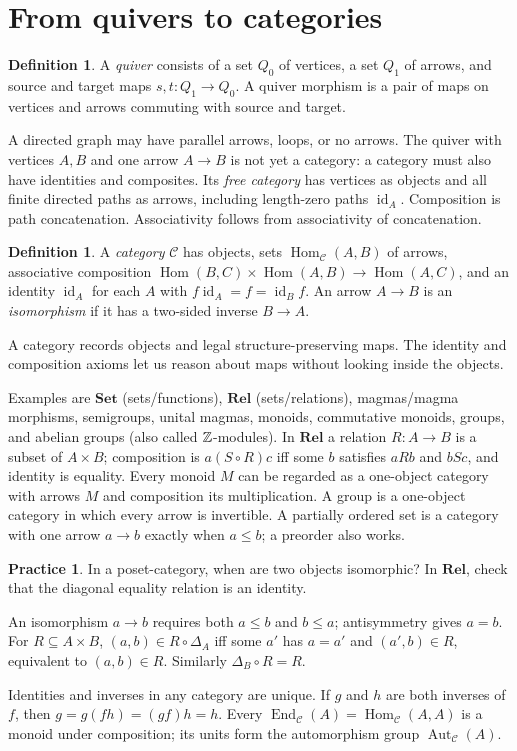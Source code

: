 \documentclass[11pt,openany]{book}
\newcommand{\id}{\operatorname{id}}\newcommand{\Sym}{\operatorname{Sym}}
\newcommand{\Hom}{\operatorname{Hom}}\newcommand{\Aut}{\operatorname{Aut}}
\newcommand{\End}{\operatorname{End}}\newcommand{\im}{\operatorname{im}}
\theoremstyle{definition}
\newtheorem{definition}[theorem]{Definition}
\newtheorem{exercise}[theorem]{Practice}
\begin{document}
\section{From quivers to categories}
\begin{definition}A \emph{quiver} consists of a set $Q_0$ of vertices, a set $Q_1$ of arrows, and source and target maps $s,t:Q_1\to Q_0$. A quiver morphism is a pair of maps on vertices and arrows commuting with source and target.\end{definition}
A directed graph may have parallel arrows, loops, or no arrows. The quiver with vertices $A,B$ and one arrow $A\to B$ is not yet a category: a category must also have identities and composites. Its \emph{free category} has vertices as objects and all finite directed paths as arrows, including length-zero paths $\id_A$. Composition is path concatenation. Associativity follows from associativity of concatenation.
\begin{definition}A \emph{category} $\mathcal C$ has objects, sets $\Hom_{\mathcal C}(A,B)$ of arrows, associative composition $\Hom(B,C)\times\Hom(A,B)\to\Hom(A,C)$, and an identity $\id_A$ for each $A$ with $f\id_A=f=\id_Bf$. An arrow $A\to B$ is an \emph{isomorphism} if it has a two-sided inverse $B\to A$.\end{definition}
\begin{intuition}A category records objects and legal structure-preserving maps. The identity and composition axioms let us reason about maps without looking inside the objects.\end{intuition}
Examples are $\mathbf{Set}$ (sets/functions), $\mathbf{Rel}$ (sets/relations), magmas/magma morphisms, semigroups, unital magmas, monoids, commutative monoids, groups, and abelian groups (also called $\mathbb Z$-modules). In $\mathbf{Rel}$ a relation $R:A\to B$ is a subset of $A\times B$; composition is $a(S\circ R)c$ iff some $b$ satisfies $aRb$ and $bSc$, and identity is equality. Every monoid $M$ can be regarded as a one-object category with arrows $M$ and composition its multiplication. A group is a one-object category in which every arrow is invertible. A partially ordered set is a category with one arrow $a\to b$ exactly when $a\le b$; a preorder also works.
\begin{exercise}In a poset-category, when are two objects isomorphic? In $\mathbf{Rel}$, check that the diagonal equality relation is an identity.\end{exercise}
\begin{solution}An isomorphism $a\to b$ requires both $a\le b$ and $b\le a$; antisymmetry gives $a=b$. For $R\subseteq A\times B$, $(a,b)\in R\circ\Delta_A$ iff some $a'$ has $a=a'$ and $(a',b)\in R$, equivalent to $(a,b)\in R$. Similarly $\Delta_B\circ R=R$.\end{solution}
Identities and inverses in any category are unique. If $g$ and $h$ are both inverses of $f$, then $g=g(fh)=(gf)h=h$. Every $\End_{\mathcal C}(A)=\Hom_{\mathcal C}(A,A)$ is a monoid under composition; its units form the automorphism group $\Aut_{\mathcal C}(A)$.
\end{document}
